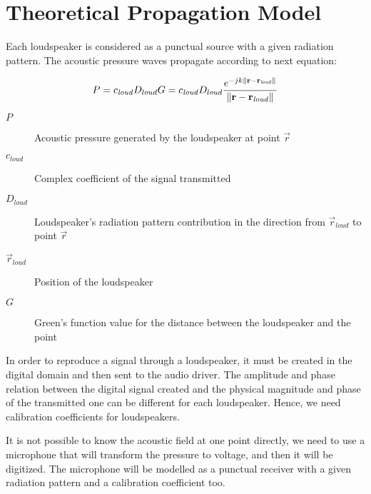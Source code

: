 \section{Theoretical Propagation Model}
\label{TheoreticalModelLabel}

Each loudspeaker is considered as a punctual source with a given radiation pattern. The acoustic pressure waves propagate according to next equation:

\begin{equation}
P = c_\mathit{loud} D_{loud} G = c_\mathit{loud} D_{loud} \frac{e^{-j k \left\| \mathbf{r} - \mathbf{r}_\mathit{loud} \right\|}}{\left\| \mathbf{r} - \mathbf{r}_\mathit{loud} \right\|}
\end{equation}

\begin{description}
	\item[$P$] Acoustic pressure generated by the loudspeaker at point $\vec{r}$
	\item[$c_\mathit{loud}$] Complex coefficient of the signal transmitted %
	\item[$D_{loud}$] Loudspeaker's radiation pattern contribution in the direction from $\vec{r}_\mathit{loud}$ to point $\vec{r}$%
	\item[$\vec{r}_{\mathit{loud}}$] Position of the loudspeaker
	\item[$G$] Green's function value for the distance between the loudspeaker and the point %
\end{description}

In order to reproduce a signal through a loudspeaker, it must be created in the digital domain and then sent to the audio driver. The amplitude and phase relation between the digital signal created and the physical magnitude and phase of the transmitted one can be different for each loudspeaker. Hence, we need calibration coefficients for loudspeakers.

It is not possible to know the acoustic field at one point directly, we need to use a microphone that will transform the pressure to voltage, and then it will be digitized. The microphone will be modelled as a punctual receiver with a given radiation pattern and a calibration coefficient too.

